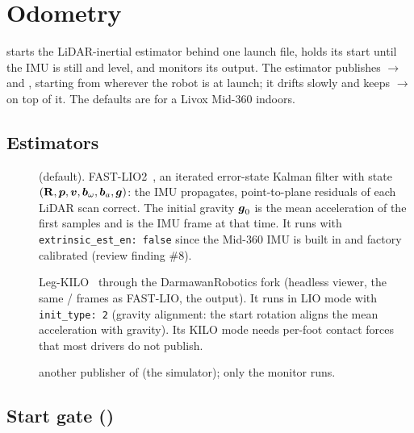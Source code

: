 \chapter{Odometry}
\label{ch:odometry}

 starts the LiDAR-inertial estimator behind one launch file, holds its
start until the IMU is still and level, and monitors its output. The estimator publishes
$\to$ and , starting from wherever the robot is at
launch; it drifts slowly and  keeps $\to$ on top of
it. The defaults are for a Livox Mid-360 indoors.

\section{Estimators}

\begin{description}
  \item[] (default). FAST-LIO2~\cite{xu2022fastlio2}, an iterated
    error-state Kalman filter with state $(\mathbf{R}, \boldsymbol{p}, \boldsymbol{v}, \boldsymbol{b}_\omega,
    \boldsymbol{b}_a, \boldsymbol{g})$: the IMU propagates, point-to-plane residuals of each LiDAR scan
    correct. The initial gravity $\boldsymbol{g}_0$ is the mean acceleration of the first samples and
     is the IMU frame at that time. It runs with \texttt{extrinsic\_est\_en: false}
    since the Mid-360 IMU is built in and factory calibrated (review finding \#8).
  \item[] Leg-KILO~\cite{ou2024legkilo} through the DarmawanRobotics fork
    (headless viewer, the same / frames as FAST-LIO, the
     output). It runs in LIO mode with \texttt{init\_type: 2}
    (gravity alignment: the start rotation aligns the mean acceleration with gravity). Its KILO
    mode needs per-foot contact forces that most drivers do not publish.
  \item[] another publisher of  (the simulator); only the
    monitor runs.
\end{description}

\section{\texorpdfstring{Start gate ()}{Start gate (wait_still)}}
\label{sec:wait-still}

